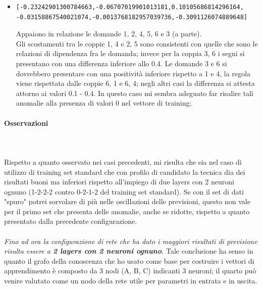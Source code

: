 \begin{itemize}
\item \begin{verbatim}[-0.23242901300784663,-0.06707019901013181,0.10105686814296164,
-0.03158867540021074,-0.0013768182957039736,-0.3091126074889648]
\end{verbatim}
Appaiono in relazione le domande 1, 2, 4, 5, 6 e 3 (a parte).\\
Gli scostamenti tra le coppie 1, 4 e 2, 5 sono consistenti con quelle che sono le relazioni di dipendenza fra le domanda; invece per la coppia 3, 6 i segni si presentano con una differenza inferiore allo 0.4.
Le domande 3 e 6 si dovrebbero presentare con una positivit\`a inferiore rispetto a 1 e 4, la regola  viene rispettata  dalle coppie 6, 1 e  6, 4; negli altri casi la differenza si attesta attorno ai valori 0.1 - 0.4. In questo caso  mi sembra adeguato far risalire tali anomalie alla presenza di valori 0 nel vettore di training;
\end{itemize}

\paragraph{Osservazioni}\mbox{}
\label{Osservazioni su rete a 4 neuroni per 1 layer}
\\\\
\noindent
Rispetto a quanto osservato nei casi precedenti, mi risulta che sia nel caso di utilizzo di training set standard che con profilo di candidato la tecnica dia dei risultati buoni ma inferiori rispetto all'impiego di due layers con 2 neuroni ognuno (1-2-2-2 contro 0-2-1-2 del training set standard). Se con il set di dati "spuro" potrei sorvolare di pi\`u nelle oscillazioni delle previsioni, questo non vale per il primo set che presenta delle anomalie, anche se ridotte, rispetto a quanto presentato dalla precedente configurazione.
\\\\
\noindent
\textit{Fino ad ora la configurazione di rete che ha dato i maggiori risultati di previsione risulta essere a \textbf{2 layers con 2 neuroni ognuno}.}
Tale conclusione ha senso in quanto il grafo della conoscenza che ho usato come base per costruire i vettori di apprendimento \`e composto da 3 nodi (A, B, C) indicanti 3 neuroni; il quarto pu\`o venire valutato come un nodo della rete utile per parametri in entrata e in uscita.



